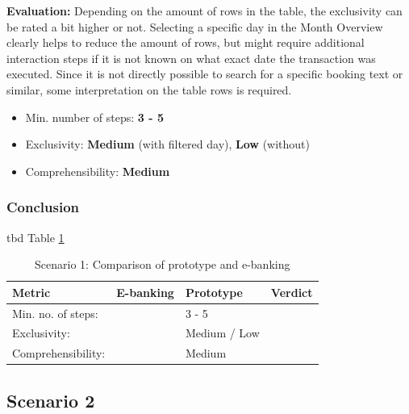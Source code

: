 \textbf{Evaluation:} Depending on the amount of rows in the table, the exclusivity can be rated a bit higher or not. Selecting a specific day in the Month Overview clearly helps to reduce the amount of rows, but might require additional interaction steps if it is not known on what exact date the transaction was executed. Since it is not directly possible to search for a specific booking text or similar, some interpretation on the table rows is required.
\begin{itemize}[noitemsep,nolistsep]
	\item Min. number of steps: \textbf{3 - 5}
	\item Exclusivity: \textbf{Medium} (with filtered day), \textbf{Low} (without)
	\item Comprehensibility: \textbf{Medium}
\end{itemize}



\subsubsection{Conclusion}

tbd Table \ref{tbl:scenarioonecomparison}

\begin{table}[t]
	\begin{center}
		\begin{tabular}{ | p{3.5cm} | p{3cm} | p{3cm} | p{3cm} | } 
			\hline
			\textbf{Metric} & \textbf{E-banking} & \textbf{Prototype} & \textbf{Verdict} \\
			\hline
				Min. no. of steps: &  & 3 - 5 &  \\
			\hline
				Exclusivity: &  & Medium / Low &  \\
			\hline
				Comprehensibility: &  & Medium &  \\
			\hline
		\end{tabular}
		\caption{Scenario 1: Comparison of prototype and e-banking}
		\label{tbl:scenarioonecomparison}
	\end{center}
\end{table}



\subsection{Scenario 2}

